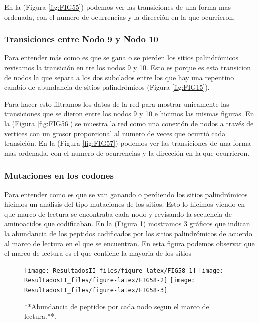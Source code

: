 \documentclass[
]{book}
\begin{document}
En la (Figura \ref{fig:FIG55}) podemos ver las transiciones de una forma mas ordenada, con el numero de ocurrencias y la dirección en la que ocurrieron.

\hypertarget{transiciones-entre-nodo-9-y-nodo-10-2}{%
\subsubsection{Transiciones entre Nodo 9 y Nodo 10}\label{transiciones-entre-nodo-9-y-nodo-10-2}}

Para entender más como es que se gana o se pierden los sitios palindrómicos revisamos la transición en tre los nodos 9 y 10. Esto es porque es esta transicion de nodos la que separa a los dos subclados entre los que hay una repentino cambio de abundancia de sitios palindrómicos (Figura \ref{fig:FIG15}).

Para hacer esto filtramos los datos de la red para mostrar unicamente las transiciones que se dieron entre los nodos 9 y 10 e hicimos las mismas figuras.
En la (Figura \ref{fig:FIG56}) se muestra la red como una conexión de nodos a través de vertices con un grosor proporcional al numero de veces que ocurrió cada transición. En la (Figura \ref{fig:FIG57}) podemos ver las transiciones de una forma mas ordenada, con el numero de ocurrencias y la dirección en la que ocurrieron.

\hypertarget{mutaciones-en-los-codones-2}{%
\subsubsection{Mutaciones en los codones}\label{mutaciones-en-los-codones-2}}

Para entender como es que se van ganando o perdiendo los sitios palindrómicos hicimos un análisis del tipo mutaciones de los sitios. Esto lo hicimos viendo en que marco de lectura se encontraba cada nodo y revisando la secuencia de aminoacidos que codificaban. En la (Figura \ref{fig:FIG58}) mostramos 3 gráficos que indican la abundancia de los peptidos codificados por los sitios palindrómicos de acuerdo al marco de lectura en el que se encuentran. En esta figura podemos observar que el marco de lectura es el que contiene la mayoria de los sitios

\begin{figure}

{\centering \texttt{[image: ResultadosII\_files/figure-latex/FIG58-1]} \texttt{[image: ResultadosII\_files/figure-latex/FIG58-2]} \texttt{[image: ResultadosII\_files/figure-latex/FIG58-3]} 

}

\caption{**Abundancia de peptidos por cada nodo segun el marco de lectura.**.}\label{fig:FIG58}
\end{figure}
\end{document}
